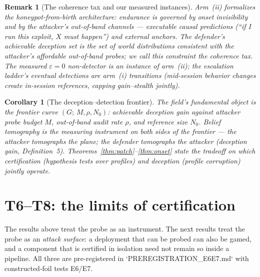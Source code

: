 \documentclass[11pt]{article}
\newtheorem{corollary}{Corollary}
\newtheorem{remark}{Remark}
\begin{document}
\begin{remark}[The coherence tax and our measured instances]
Arm~(ii) formalizes the honeypot-from-birth architecture: endurance is governed by onset invisibility and by the attacker's \emph{out-of-band} channels --- executable causal predictions (``if I run this exploit, $X$ must happen'') and external anchors. The defender's achievable deception set is the set of world distributions consistent with the attacker's \emph{affordable} out-of-band probes; we call this constraint the \emph{coherence tax}. The measured $\varepsilon=0$ non-detector is an instance of arm~(ii); the escalation ladder's eventual detections are arm~(i) transitions (mid-session behavior changes create in-session references, capping gain--stealth jointly).
\end{remark}

\begin{corollary}[The deception--detection frontier]\label{cor:frontier}
The field's fundamental object is the frontier curve $(G;\,M,\rho,N_0)$: achievable deception gain against attacker probe budget $M$, out-of-band audit rate $\rho$, and reference size $N_0$. Belief tomography is the measuring instrument on both sides of the frontier --- the attacker tomographs the plane; the defender tomographs the attacker (deception gain, Definition~5). Theorems~\ref{thm:patch}--\ref{thm:onset} state the tradeoff on which certification (hypothesis tests over profiles) and deception (profile corruption) jointly operate.
\end{corollary}

\section{T6--T8: the limits of certification}\label{sec:limits}

The results above treat the probe as an instrument. The next results treat the
probe as an \emph{attack surface}: a deployment that can be probed can also be
gamed, and a component that is certified in isolation need not remain so inside
a pipeline. All three are pre-registered in
`PREREGISTRATION\_E6E7.md` with constructed-foil tests E6/E7.
\end{document}
